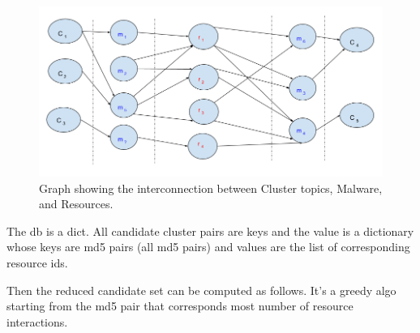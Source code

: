 \begin{figure}[htbp]
  \centering
  \includegraphics[scale=0.45]{figures/dhkherusitcs.png}
  \caption[]{Graph showing the interconnection between Cluster topics, Malware, and Resources.}\label{fig:dhkheuristics}
\end{figure}

The db is a dict. All candidate cluster pairs are keys and the value is a dictionary whose keys are md5 pairs (all md5 pairs) and values are the list of corresponding resource ids. 

Then the reduced candidate set can be computed as follows. It's a greedy algo starting from the md5 pair that corresponds most number of resource interactions.

